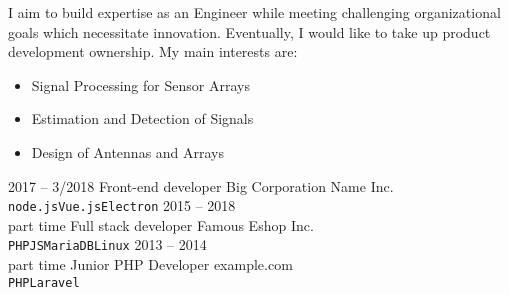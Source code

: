 \documentclass[10pt]{developercv} %
\begin{document}
\vspace{0.5cm}



\begin{minipage}[t]{0.5\textwidth} %
	\vspace{-\baselineskip} %
	I aim to build expertise as an Engineer while meeting challenging organizational goals which necessitate innovation. Eventually, I would like to take up product development ownership. My main interests are: 
	\begin{itemize}
		\item Signal Processing for Sensor Arrays
		\item Estimation and Detection of Signals
		\item Design of Antennas and Arrays
	\end{itemize}
\end{minipage}
\hfill %
\begin{minipage}[t]{0.4\textwidth} %
	\vspace{-\baselineskip} %
	\begin{barchart}{4.5}
	\end{barchart}
\end{minipage}

\begin{center}
\end{center}



\begin{entrylist}
	\entry
		{2017 -- 3/2018}
		{Front-end developer}
		{Big Corporation Name Inc.}
		{\lorem \lorem \lorem\\ \texttt{node.js}\slashsep\texttt{Vue.js}\slashsep\texttt{Electron}}
	\entry
		{2015 -- 2018\\\footnotesize{part time}}
		{Full stack developer}
		{Famous Eshop Inc.}
		{\lorem\lorem\\ \texttt{PHP}\slashsep\texttt{JS}\slashsep\texttt{MariaDB}\slashsep\texttt{Linux}}
	\entry
		{2013 -- 2014\\\footnotesize{part time}}
		{Junior PHP Developer}
		{example.com}
		{\lorem\lorem\\ \texttt{PHP}\slashsep\texttt{Laravel}}
\end{entrylist}
\end{document}
